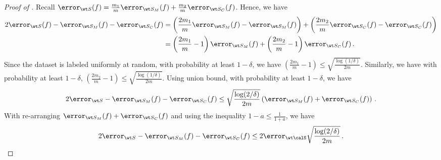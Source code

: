 \begin{proof}[Proof of ]
    Recall $\error_{\wt S} (f) = \frac{m_1}{m} \error_{\wt S_M}(f) + \frac{m_2}{m} \error_{\wt S_C}(f)$. Hence, we have 
    \begin{align}
        2\error_{\wt S}(f) - \error_{\wt S_M}(f) - \error_{\wt S_C}(f) &= \left(\frac{2m_1}{m} \error_{\wt S_M}(f) - \error_{\wt S_M}(f)\right) + \left(\frac{2m_2}{m} \error_{\wt S_C}(f) - \error_{\wt S_C}(f)\right) \\ &= \left(\frac{2m_1}{m} - 1\right) \error_{\wt S_M}(f) + \left(\frac{2m_2}{m} - 1 \right)\error_{\wt S_C} (f) \,.
    \end{align} 
    Since the dataset is labeled uniformly at random, with probability at least $1-\delta$, we have  $\left(\frac{2m_1}{m} - 1\right) \le \sqrt{\frac{\log(1/\delta)}{2m}}$. Similarly, we have with probability at least $1-\delta$, $\left(\frac{2m_2}{m} - 1\right) \le \sqrt{\frac{\log(1/\delta)}{2m}}$. Using union bound, with probability at least $1-\delta$, we have
    \begin{align}
        2\error_{\wt S} - \error_{\wt S_M}(f) - \error_{\wt S_C}(f) \le \sqrt{\frac{\log(2/\delta)}{2m}} \left(\error_{\wt S_M}(f) + \error_{\wt S_C}(f) \right) \,. \label{eq:lemma2_prefinal}
    \end{align}
    With re-arranging $\error_{\wt S_M}(f) + \error_{\wt S_C}(f)$ and using the inequality $ 1- a\le \frac{1}{1+a} $, we have  
    \begin{align}
        2\error_{\wt S} - \error_{\wt S_M}(f) - \error_{\wt S_C}(f) \le 2\error_{\wt \calS} \sqrt{\frac{\log(2/\delta)}{2m}}  \,. \label{eq:lemma2_final}
    \end{align}

\end{proof}

